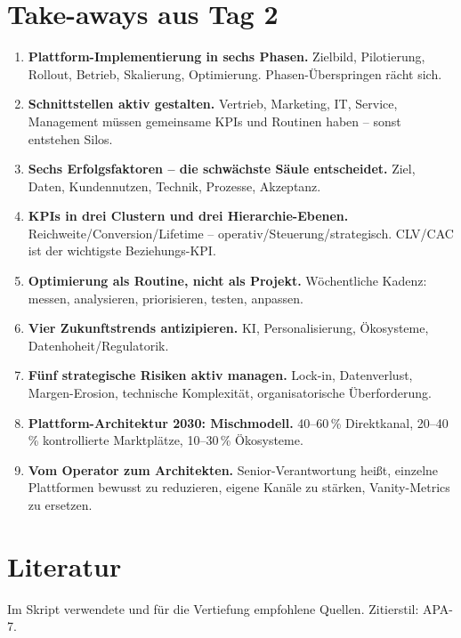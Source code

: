 \documentclass[11pt,a4paper,oneside]{article}
\begin{document}
\section{Take-aways aus Tag 2}

\begin{enumerate}
  \item \textbf{Plattform-Implementierung in sechs Phasen.} Zielbild, Pilotierung, Rollout, Betrieb, Skalierung, Optimierung. Phasen-Überspringen rächt sich.
  \item \textbf{Schnittstellen aktiv gestalten.} Vertrieb, Marketing, IT, Service, Management müssen gemeinsame KPIs und Routinen haben -- sonst entstehen Silos.
  \item \textbf{Sechs Erfolgsfaktoren -- die schwächste Säule entscheidet.} Ziel, Daten, Kundennutzen, Technik, Prozesse, Akzeptanz.
  \item \textbf{KPIs in drei Clustern und drei Hierarchie-Ebenen.} Reichweite/Conversion/Lifetime -- operativ/Steuerung/strategisch. CLV/CAC ist der wichtigste Beziehungs-KPI.
  \item \textbf{Optimierung als Routine, nicht als Projekt.} Wöchentliche Kadenz: messen, analysieren, priorisieren, testen, anpassen.
  \item \textbf{Vier Zukunftstrends antizipieren.} KI, Personalisierung, Ökosysteme, Datenhoheit/Regulatorik.
  \item \textbf{Fünf strategische Risiken aktiv managen.} Lock-in, Datenverlust, Margen-Erosion, technische Komplexität, organisatorische Überforderung.
  \item \textbf{Plattform-Architektur 2030: Mischmodell.} 40--60\,\% Direktkanal, 20--40\,\% kontrollierte Marktplätze, 10--30\,\% Ökosysteme.
  \item \textbf{Vom Operator zum Architekten.} Senior-Verantwortung heißt, einzelne Plattformen bewusst zu reduzieren, eigene Kanäle zu stärken, Vanity-Metrics zu ersetzen.
\end{enumerate}

\clearpage
\section{Literatur}

Im Skript verwendete und für die Vertiefung empfohlene Quellen. Zitierstil: APA-7.
\end{document}
